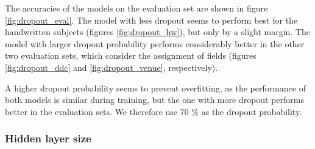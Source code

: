 The accuracies of the models on the evaluation set are shown in figure \ref{fig:dropout_eval}. The model with less dropout seems to perform best for the handwritten subjects (figures \ref{fig:dropout_hw}), but only by a slight margin. The model with larger dropout probability performs considerably better in the other two evaluation sets, which consider the assignment of fields (figures \ref{fig:dropout_ddc} and \ref{fig:dropout_venue}, respectively).

A higher dropout probability seems to prevent overfitting, as the performance of both models is similar during training, but the one with more dropout performs better in the evaluation sets. We therefore use 70 \% as the dropout probability.

\subsubsection{Hidden layer size}

